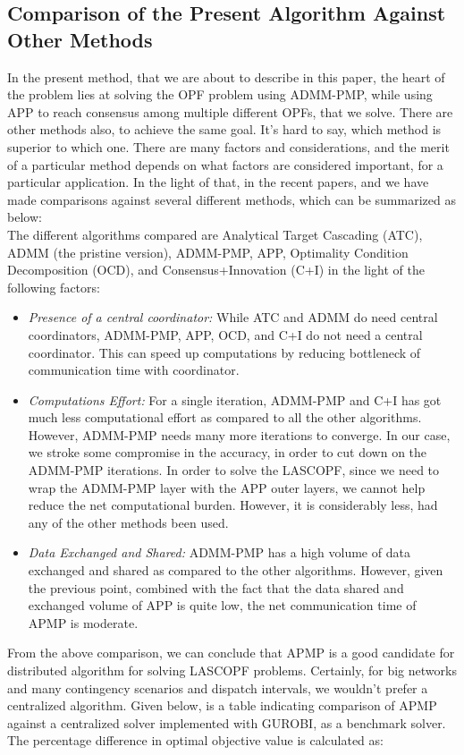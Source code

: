 \documentclass[preprint,12pt,3p]{elsarticle}
\begin{document}
\subsection{Comparison of the Present Algorithm Against Other Methods}In the present method, that we are about to describe in this paper, the heart of the problem lies at solving the OPF problem using ADMM-PMP, while using APP to reach consensus among multiple different OPFs, that we solve. There are other methods also, to achieve the same goal. It's hard to say, which method is superior to which one. There are many factors and considerations, and the merit of a particular method depends on what factors are considered important, for a particular application. In the light of that, in the recent papers, \cite{SurvKarg} and \cite{SurvMol} we have made comparisons against several different methods, which can be summarized as below:\\
The different algorithms compared are Analytical Target Cascading (ATC), ADMM (the pristine version), ADMM-PMP, APP, Optimality Condition Decomposition (OCD), and Consensus+Innovation (C+I) in the light of the following factors:\\
\begin{itemize}
    \item \textit{Presence of a central coordinator:} While ATC and ADMM do need central coordinators, ADMM-PMP, APP, OCD, and C+I do not need a central coordinator. This can speed up computations by reducing bottleneck of communication time with coordinator.
    \item \textit{Computations Effort:} For a single iteration, ADMM-PMP and C+I has got much less computational effort as compared to all the other algorithms. However, ADMM-PMP needs many more iterations to converge. In our case, we stroke some compromise in the accuracy, in order to cut down on the ADMM-PMP iterations. In order to solve the LASCOPF, since we need to wrap the ADMM-PMP layer with the APP outer layers, we cannot help reduce the net computational burden. However, it is considerably less, had any of the other methods been used.
    \item \textit{Data Exchanged and Shared: }ADMM-PMP has a high volume of data exchanged and shared as compared to the other algorithms. However, given the previous point, combined with the fact that the data shared and exchanged volume of APP is quite low, the net communication time of APMP is moderate.
\end{itemize}
From the above comparison, we can conclude that APMP is a good candidate for distributed algorithm for solving LASCOPF problems. Certainly, for big networks and many contingency scenarios and dispatch intervals, we wouldn't prefer a centralized algorithm. Given below, is a table indicating comparison of APMP against a centralized solver implemented with GUROBI, as a benchmark solver. The percentage difference in optimal objective value is calculated as:\\
\end{document}
